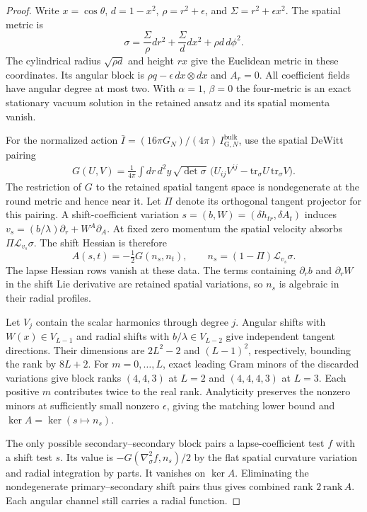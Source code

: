 \begin{proof}
Write $x=\cos\theta$, $d=1-x^2$, $\rho=r^2+\epsilon$, and $\Sigma=r^2+\epsilon x^2$. The spatial metric is
\begin{equation}
\sigma=\frac{\Sigma}{\rho}dr^2+\frac{\Sigma}{d}dx^2+\rho d\,d\phi^2 .
\end{equation}
The cylindrical radius $\sqrt{\rho d}$ and height $rx$ give the Euclidean metric in these coordinates. Its angular block is $\rho q-\epsilon\,dx\otimes dx$ and $A_r=0$. All coefficient fields have angular degree at most two. With $\alpha=1$, $\beta=0$ the four-metric is an exact stationary vacuum solution in the retained ansatz and its spatial momenta vanish.

For the normalized action $\bar I=(16\pi G_N)/(4\pi)\,I_{\mathrm{G},N}^{\mathrm{bulk}}$, use the spatial DeWitt pairing
\begin{align}
G(U,V)=\frac{1}{4\pi}\int dr\,d^2y\,\sqrt{\det\sigma}\,
\bigl(U_{ij}V^{ij}-\mathrm{tr}_\sigma U\,\mathrm{tr}_\sigma V\bigr).
\end{align}
The restriction of $G$ to the retained spatial tangent space is nondegenerate at the round metric and hence near it. Let $\Pi$ denote its orthogonal tangent projector for this pairing. A shift-coefficient variation $s=(b,W)=(\delta h_{tr},\delta A_t)$ induces $v_s=(b/\lambda)\partial_r+W^A\partial_A$. At fixed zero momentum the spatial velocity absorbs $\Pi\mathcal L_{v_s}\sigma$. The shift Hessian is therefore
\begin{equation}
A(s,t)=-\tfrac12 G(n_s,n_t),\qquad
n_s=(1-\Pi)\mathcal L_{v_s}\sigma .
\end{equation}
The lapse Hessian rows vanish at these data. The terms containing $\partial_r b$ and $\partial_r W$ in the shift Lie derivative are retained spatial variations, so $n_s$ is algebraic in their radial profiles.

Let $V_j$ contain the scalar harmonics through degree $j$. Angular shifts with $W(x)\in V_{L-1}$ and radial shifts with $b/\lambda\in V_{L-2}$ give independent tangent directions. Their dimensions are $2L^2-2$ and $(L-1)^2$, respectively, bounding the rank by $8L+2$. For $m=0,\ldots,L$, exact leading Gram minors of the discarded variations give block ranks $(4,4,3)$ at $L=2$ and $(4,4,4,3)$ at $L=3$. Each positive $m$ contributes twice to the real rank. Analyticity preserves the nonzero minors at sufficiently small nonzero $\epsilon$, giving the matching lower bound and $\ker A=\ker(s\mapsto n_s)$.

The only possible secondary--secondary block pairs a lapse-coefficient test $f$ with a shift test $s$. Its value is $-G(\nabla^2_\sigma f,n_s)/2$ by the flat spatial curvature variation and radial integration by parts. It vanishes on $\ker A$. Eliminating the nondegenerate primary--secondary shift pairs thus gives combined rank $2\,\mathrm{rank}\,A$. Each angular channel still carries a radial function.
\end{proof}


